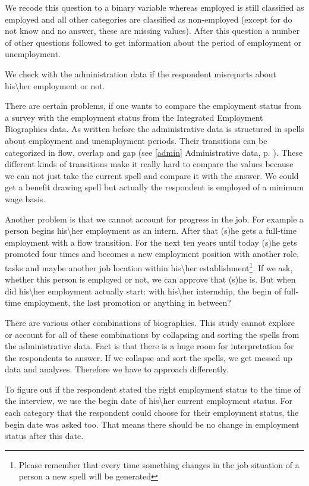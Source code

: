 We recode this question to a binary variable whereas employed is still classified as employed and all other categories are classified as non-employed (except for do not know and no answer, these are missing values). After this question a number of other questions followed to get information about the period of employment or unemployment.

We check with the administration data if the respondent misreports about his\textbackslash her employment or not.

There are certain problems, if one wants to compare the employment status from a survey with the employment status from the Integrated Employment Biographies data. As written before the administrative data is structured in spells about employment and unemployment periods. Their transitions can be categorized in flow, overlap and gap (see \ref{admin} Administrative data, p. \pageref{admin}). These different kinds of transitions make it really hard to compare the values because we can not just take the current spell and compare it with the answer. We could get a benefit drawing spell but actually the respondent is employed of a minimum wage basis.

Another problem is that we cannot account for progress in the job. For example a person begins his\textbackslash her employment as an intern. After that (s)he gets a full-time employment with a flow transition. For the next ten years until today (s)he gets promoted four times and becomes a new employment position with another role, tasks and maybe another job location within his\textbackslash her establishment\footnote{Please remember that every time something changes in the job situation of a person a new spell will be generated}. If we ask, whether this person is employed or not, we can approve that (s)he is. But when did his\textbackslash her employment actually start: with his\textbackslash her internship, the begin of full-time employment, the last promotion or anything in between?

There are various other combinations of biographies. This study cannot explore or account for all of these combinations by collapsing and sorting the spells from the administrative data. Fact is that there is a huge room for interpretation for the respondents to answer. If we collapse and sort the spells, we get messed up data and analyses. Therefore we have to approach differently.

To figure out if the respondent stated the right employment status to the time of the interview, we use the begin date of his\textbackslash her current employment status. For each category that the respondent could choose for their employment status, the begin date was asked too. That means there should be no change in employment status after this date.

